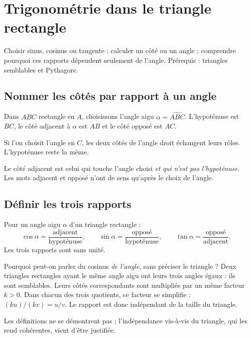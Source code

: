 \documentclass[../cours_3e.tex]{subfiles}
\begin{document}
\setcounter{chapter}{14}
\chapter{Trigonométrie dans le triangle rectangle}
\label{ch:trigo}
\begin{objectif}
Choisir sinus, cosinus ou tangente ; calculer un côté ou un angle ; comprendre pourquoi ces rapports dépendent seulement de l'angle. Prérequis : triangles semblables et Pythagore.
\end{objectif}
\section{Nommer les côtés par rapport à un angle}
Dans $ABC$ rectangle en $A$, choisissons l'angle aigu $\alpha=\widehat{ABC}$. L'hypoténuse est $BC$, le côté adjacent à $\alpha$ est $AB$ et le côté opposé est $AC$.
\begin{center}
\end{center}
Si l'on choisit l'angle en $C$, les deux côtés de l'angle droit échangent leurs rôles. L'hypoténuse reste la même.
\begin{attention}
Le côté adjacent est celui qui touche l'angle choisi \emph{et qui n'est pas l'hypoténuse}. Les mots adjacent et opposé n'ont de sens qu'après le choix de l'angle.
\end{attention}
\section{Définir les trois rapports}
\begin{definition}
Pour un angle aigu $\alpha$ d'un triangle rectangle :
\[
\cos\alpha=\frac{\text{adjacent}}{\text{hypoténuse}},\qquad
\sin\alpha=\frac{\text{opposé}}{\text{hypoténuse}},\qquad
\tan\alpha=\frac{\text{opposé}}{\text{adjacent}}.
\]
Les trois rapports sont sans unité.
\end{definition}
\begin{demonstration}
Pourquoi peut-on parler du cosinus \emph{de l'angle}, sans préciser le triangle ? Deux triangles rectangles ayant le même angle aigu ont leurs trois angles égaux : ils sont semblables. Leurs côtés correspondants sont multipliés par un même facteur $k>0$. Dans chacun des trois quotients, ce facteur se simplifie : $(ku)/(kv)=u/v$. Le rapport est donc indépendant de la taille du triangle.
\end{demonstration}
Les définitions ne se démontrent pas ; l'indépendance vis-à-vis du triangle, qui les rend cohérentes, vient d'être justifiée.
\end{document}

